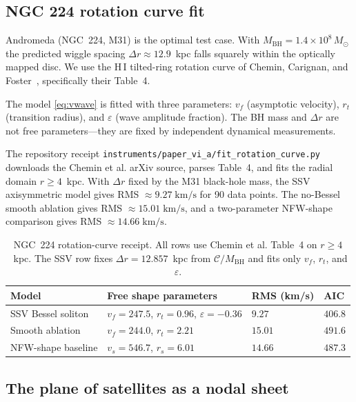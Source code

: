 \documentclass[11pt,a4paper]{article}
\begin{document}
\subsection{NGC 224 rotation curve fit}

Andromeda (NGC~224, M31) is the optimal test case.  With $M_\mathrm{BH} =
1.4\times10^8\,M_\odot$ the predicted wiggle spacing $\Delta r \approx 12.9$~kpc falls
squarely within the optically mapped disc.  We use the H\,I tilted-ring rotation curve of
Chemin, Carignan, and Foster~\cite{chemin2009}, specifically their Table~4.

The model \eqref{eq:vwave} is fitted with three parameters: $v_f$ (asymptotic velocity),
$r_t$ (transition radius), and $\varepsilon$ (wave amplitude fraction).  The BH mass and
$\Delta r$ are not free parameters---they are fixed by independent dynamical measurements.

\begin{resultbox}
The repository receipt
\texttt{instruments/paper\_vi\_a/fit\_rotation\_curve.py} downloads the
Chemin et al. arXiv source, parses Table~4, and fits the radial domain
$r\ge4$~kpc.  With $\Delta r$ fixed by the M31 black-hole mass, the SSV
axisymmetric model gives RMS $\approx9.27\;\mathrm{km/s}$ for 90 data points.
The no-Bessel smooth ablation gives RMS $\approx15.01\;\mathrm{km/s}$, and a
two-parameter NFW-shape comparison gives RMS $\approx14.66\;\mathrm{km/s}$.
\end{resultbox}

\begin{table}[H]
\centering
\caption{NGC~224 rotation-curve receipt.  All rows use Chemin et al. Table~4 on
$r\ge4$~kpc.  The SSV row fixes $\Delta r=12.857$~kpc from
$\mathcal C/M_\mathrm{BH}$ and fits only $v_f$, $r_t$, and $\varepsilon$.}
\label{tab:m31-fit}
\begin{tabular}{@{}llll@{}}
\toprule
Model & Free shape parameters & RMS (km/s) & AIC \\
\midrule
SSV Bessel soliton & $v_f=247.5$, $r_t=0.96$, $\varepsilon=-0.36$ & $9.27$ & $406.8$ \\
Smooth ablation & $v_f=244.0$, $r_t=2.21$ & $15.01$ & $491.6$ \\
NFW-shape baseline & $v_s=546.7$, $r_s=6.01$ & $14.66$ & $487.3$ \\
\bottomrule
\end{tabular}
\end{table}

\subsection{The plane of satellites as a nodal sheet}
\end{document}
